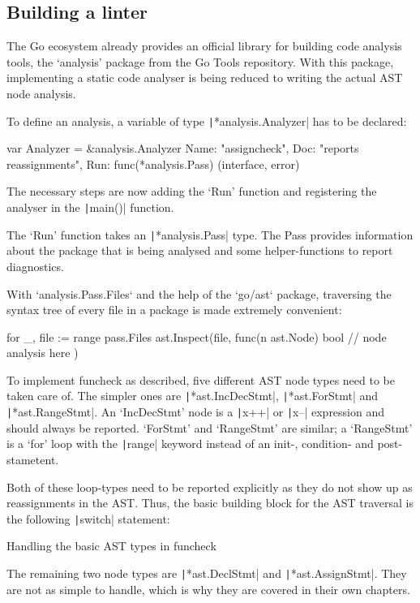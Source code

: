 \subsection{Building a linter}

The Go ecosystem already provides an official library for building code analysis tools,
the `analysis' package from the Go Tools repository\autocite{go-analysis}. With this package,
implementing a static code analyser is being reduced to writing the actual AST node analysis.

To define an analysis, a variable of type \texttt|*analysis.Analyzer| has to be declared:

\begin{gocode}
var Analyzer = &analysis.Analyzer{
	Name: "assigncheck",
	Doc:  "reports reassignments",
	Run:  func(*analysis.Pass) (interface{}, error)
}
\end{gocode}

The necessary steps are now adding the `Run' function and registering the analyser
in the \texttt|main()| function.

The `Run' function takes an \texttt|*analysis.Pass| type. The Pass provides
information about the package that is being analysed and some helper-functions to report
diagnostics.

With `analysis.Pass.Files` and the help of the `go/ast` package, traversing the syntax
tree of every file in a package is made extremely convenient:

\begin{gocode}
for _, file := range pass.Files {
	ast.Inspect(file, func(n ast.Node) bool {
		// node analysis here
	})
}
\end{gocode}

To implement funcheck as described, five different AST node types need to be
taken care of. The simpler ones are
\texttt|*ast.IncDecStmt|, \texttt|*ast.ForStmt| and \texttt|*ast.RangeStmt|.
An `IncDecStmt' node is a \texttt|x++| or \texttt|x--|
expression and should always be reported.
`ForStmt' and `RangeStmt' are similar; a `RangeStmt' is a `for' loop with the
\texttt|range| keyword instead of an init-, condition- and post-stametent.

Both of these loop-types need to be reported explicitly as they do not show up
as reassignments in the AST.
Thus, the basic building block for the AST traversal is the following \texttt|switch|
statement:
\begin{code}
	\caption{Handling the basic AST types in funcheck}
\end{code}
The remaining two node types are \texttt|*ast.DeclStmt| and \texttt|*ast.AssignStmt|.
They are not as simple to handle, which is why they are covered in their own chapters.

